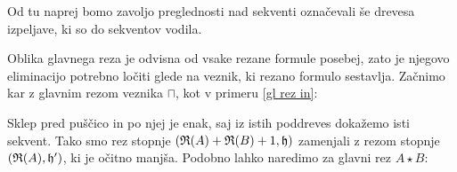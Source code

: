 Od tu naprej bomo zavoljo preglednosti nad sekventi označevali še drevesa izpeljave, ki so do sekventov vodila.

Oblika glavnega reza je odvisna od vsake rezane formule posebej, zato je njegovo eliminacijo potrebno ločiti glede na veznik, ki rezano formulo sestavlja. Začnimo kar z glavnim rezom veznika $\sqcap$, kot v primeru \ref{gl rez in}:
\begin{prooftree}


\end{prooftree}
\dol
\begin{prooftree}
\end{prooftree}
Sklep pred puščico in po njej je enak, saj iz istih poddreves dokažemo isti sekvent. Tako smo rez stopnje $(\R(A) + \R(B) + 1,\h)$ zamenjali z rezom stopnje $(\R(A),\h')$, ki je očitno manjša. Podobno lahko naredimo za glavni rez $A \star B$:
\begin{prooftree}


\end{prooftree}
\dol
\begin{prooftree}

\end{prooftree}
